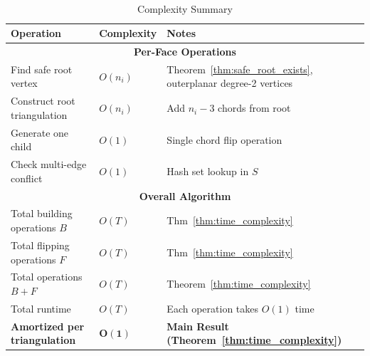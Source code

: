 ﻿﻿\documentclass[12pt,a4paper]{article}
\theoremstyle{definition}
\theoremstyle{remark}
\begin{document}
\begin{table}[H]
	\centering
	\caption{Complexity Summary}
	\label{tab:complexity_summary}
	\small
	\begin{tabular}{|l|l|p{6.5cm}|}
		\hline
		\textbf{Operation}                   & \textbf{Complexity}                      & \textbf{Notes}                                                    \\
		\hline
		\multicolumn{3}{|c|}{\textbf{Per-Face Operations}}                                                                                                  \\
		\hline
		Find safe root vertex                & $O(n_i)$                                 & Theorem~\ref{thm:safe_root_exists}, outerplanar degree-2 vertices \\
		\hline
		Construct root triangulation         & $O(n_i)$                                 & Add $n_i-3$ chords from root                                      \\
		\hline
		Generate one child                   & $O(1)$                                   & Single chord flip operation                                       \\
		\hline
		Check multi-edge conflict            & $O(1)$                                   & Hash set lookup in $S$                                            \\
		\hline
		\multicolumn{3}{|c|}{\textbf{Overall Algorithm}}                                                                                                    \\
		\hline
		Total building operations $B$        & $O(T)$                                   & Thm~\ref{thm:time_complexity}                                     \\
		\hline
		Total flipping operations $F$        & $O(T)$                                   & Thm~\ref{thm:time_complexity}                                     \\
		\hline
		Total operations $B + F$             & $O(T)$                                   & Theorem~\ref{thm:time_complexity}                                 \\
		\hline
		Total runtime                        & $O(T)$                                   & Each operation takes $O(1)$ time                                  \\
		\hline
		\textbf{Amortized per triangulation} & $\mathbf{O(1)}$                          & \textbf{Main Result (Theorem~\ref{thm:time_complexity})}          \\

\end{tabular}
\end{table}
\end{document}

